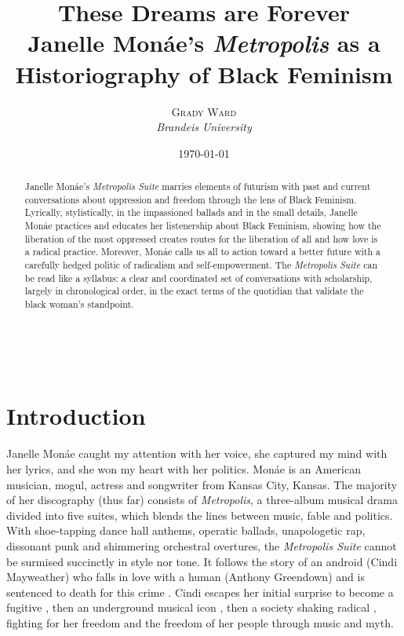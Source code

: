 \documentclass[a4paper, 11pt]{article} %
\title{\textbf{\linespread{2.1}These Dreams are Forever}\\ %
Janelle Mon\'ae's \emph{Metropolis} as a Historiography of Black Feminism} %
\author{\textsc{Grady Ward} %
\\{\textit{Brandeis University}}} %
\date{\today} %
\makeatletter
\renewcommand{\maketitle}{ %
\begin{flushright} %
	{\LARGE\@title} %

	\vspace{40pt} %

	{\large\@author} %
	\\\@date %

	\vspace{30pt} %
\end{flushright}
}
\makeatother
\begin{document}
\maketitle %


\begin{abstract}

Janelle Mon\'ae's \emph{Metropolis Suite} marries elements of futurism with past and current conversations about oppression and freedom through the lens of Black Feminism.
Lyrically, stylistically, in the impassioned ballads and in the small details, Janelle Mon\'ae practices and educates her listenership about Black Feminism, showing how the liberation of the most oppressed creates routes for the liberation of all and how love is a radical practice.
Moreover, Mon\'ae calls us all to action toward a better future with a carefully hedged politic of radicalism and self-empowerment.
The \emph{Metropolis Suite} can be read like a syllabus: a clear and coordinated set of conversations with scholarship, largely in chronological order, in the exact terms of the quotidian that validate the black woman's standpoint.
\end{abstract}

\vspace{30pt}


\section*{Introduction}

Janelle Mon\'ae caught my attention with her voice, she captured my mind with her lyrics, and she won my heart with her politics.
Mon\'ae is an American musician, mogul, actress and songwriter from Kansas City, Kansas.
The majority of her discography (thus far) consists of \emph{Metropolis}, a three-album musical drama divided into five suites, which blends the lines between music, fable and politics.
With shoe-tapping dance hall anthems, operatic ballads, unapologetic rap, dissonant punk and shimmering orchestral overtures, the \emph{Metropolis Suite} cannot be surmised succinctly in style nor tone.
It follows the story of an android (Cindi Mayweather) who falls in love with a human (Anthony Greendown) and is sentenced to death for this crime \cite{wolfmasters}.
Cindi escapes her initial surprise to become a fugitive \cite{manymoons}, then an underground musical icon \cite{favoritefugitive}, then a society shaking radical \cite{fiveseveneighttwoone}, fighting for her freedom and the freedom of her people through music and myth.
\end{document}
